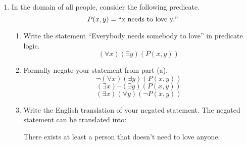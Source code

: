 \documentclass[12pt]{article}
\begin{document}
\begin{enumerate}
\begin{enumerate}
            \end{enumerate}
      \item In the domain of all people, consider the following predicate.
            \[P(x,y) = \text{\textquotedblleft} \text{x needs to love y.} \text{\textquotedblright}\]
            \begin{enumerate}
                  \item Write the statement “Everybody needs somebody to love” in predicate logic.
                        \[(\forall x)(\exists y)(P(x,y))\]
                  \item Formally negate your statement from part (a).
                        \[\neg (\forall x)(\exists y)(P(x,y))\]
                        \[(\exists x)\neg(\exists y)(P(x,y))\]
                        \[(\exists x)(\forall y)(\neg P(x,y))\]
                  \item Write the English translation of your negated statement.
                        The negated statement can be translated into:
                        \begin{center}
                              There exists at least a person that doesn't need to love anyone.
                        \end{center}
            \end{enumerate}
\end{enumerate}
\end{document}
